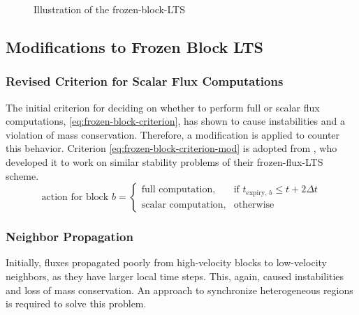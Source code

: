 \begin{figure} [htbp]
\begin{subfigure}{0.8\textwidth}
  \end{subfigure}
  \caption{Illustration of the \acrlong{frozen-block-LTS}}
  \label{fig:frozen-block-lts}
\end{figure}


\subsection{Modifications to Frozen Block LTS} \label{sec:mods}
\subsubsection{Revised Criterion for Scalar Flux Computations}  \label{sec:criterion-mod}
The initial criterion for deciding on whether to perform full or scalar flux computations, \autoref{eq:frozen-block-criterion}, has shown to cause instabilities and a violation of mass conservation. Therefore, a modification is applied to counter this behavior. Criterion \ref{eq:frozen-block-criterion-mod} is adopted from \textcite{zhang1994a}, who developed it to work on similar stability problems of their \acrlong{frozen-flux-LTS} scheme.
\begin{equation}
  \label{eq:frozen-block-criterion-mod}
  \text{action for block } b = 
  \left\{
    \begin{array}{ll}
      \text{full computation}, & \text{if } t_{\text{expiry}, \, b} \leq t + 2 \Delta t\\
      \text{scalar computation}, & \text{otherwise}
    \end{array}
  \right.
\end{equation}


\subsubsection{Neighbor Propagation}\label{sec:neighprop}
Initially, fluxes propagated poorly from high-velocity blocks to low-velocity neighbors, as they have larger local time steps. This, again, caused instabilities and loss of mass conservation.
An approach to synchronize heterogeneous regions is required to solve this problem.

